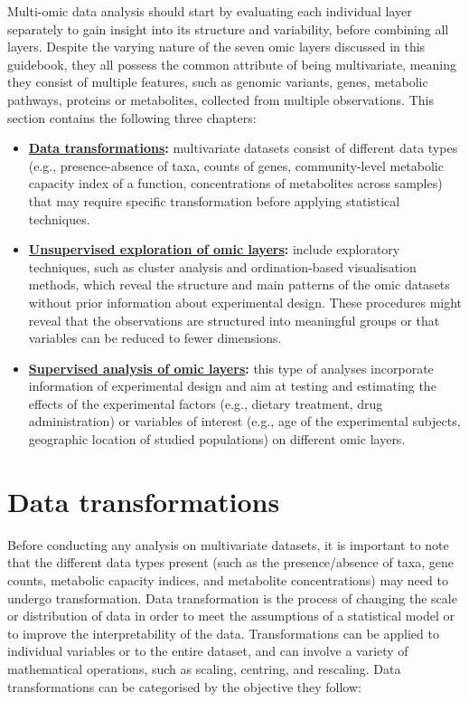 \documentclass[
]{book}
\providecommand{\tightlist}{%
  \setlength{\itemsep}{0pt}\setlength{\parskip}{0pt}}
\begin{document}
Multi-omic data analysis should start by evaluating each individual layer separately to gain insight into its structure and variability, before combining all layers. Despite the varying nature of the seven omic layers discussed in this guidebook, they all possess the common attribute of being multivariate, meaning they consist of multiple features, such as genomic variants, genes, metabolic pathways, proteins or metabolites, collected from multiple observations. This section contains the following three chapters:

\begin{itemize}
\tightlist
\item
  \textbf{\protect\hyperlink{data-transformations}{Data transformations}:} multivariate datasets consist of different data types (e.g., presence-absence of taxa, counts of genes, community-level metabolic capacity index of a function, concentrations of metabolites across samples) that may require specific transformation before applying statistical techniques.
\item
  \textbf{\protect\hyperlink{unsupervised-exploration}{Unsupervised exploration of omic layers}:} include exploratory techniques, such as cluster analysis and ordination-based visualisation methods, which reveal the structure and main patterns of the omic datasets without prior information about experimental design. These procedures might reveal that the observations are structured into meaningful groups or that variables can be reduced to fewer dimensions.
\item
  \textbf{\protect\hyperlink{supervised-analysis}{Supervised analysis of omic layers}:} this type of analyses incorporate information of experimental design and aim at testing and estimating the effects of the experimental factors (e.g., dietary treatment, drug administration) or variables of interest (e.g., age of the experimental subjects, geographic location of studied populations) on different omic layers.
\end{itemize}

\hypertarget{data-transformations}{%
\chapter{Data transformations}\label{data-transformations}}

Before conducting any analysis on multivariate datasets, it is important to note that the different data types present (such as the presence/absence of taxa, gene counts, metabolic capacity indices, and metabolite concentrations) may need to undergo transformation. Data transformation is the process of changing the scale or distribution of data in order to meet the assumptions of a statistical model or to improve the interpretability of the data. Transformations can be applied to individual variables or to the entire dataset, and can involve a variety of mathematical operations, such as scaling, centring, and rescaling. Data transformations can be categorised by the objective they follow:
\end{document}

